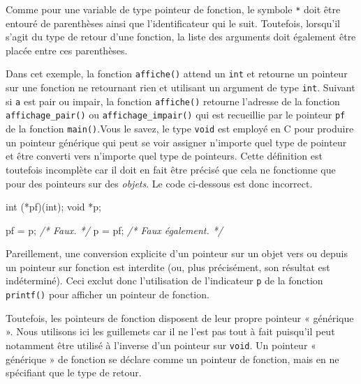 \documentclass[]{article}
\newenvironment{Shaded}{}{}
\newcommand{\DataTypeTok}[1]{\textcolor[rgb]{0.56,0.13,0.00}{{#1}}}
\newcommand{\SpecialCharTok}[1]{\textcolor[rgb]{0.25,0.44,0.63}{{#1}}}
\newcommand{\StringTok}[1]{\textcolor[rgb]{0.25,0.44,0.63}{{#1}}}
\newcommand{\CommentTok}[1]{\textcolor[rgb]{0.38,0.63,0.69}{\textit{{#1}}}}
\newcommand{\NormalTok}[1]{{#1}}
\begin{document}
Comme pour une variable de type pointeur de fonction, le symbole
\texttt{*} doit être entouré de parenthèses ainsi que l'identificateur
qui le suit. Toutefois, lorsqu'il s'agit du type de retour d'une
fonction, la liste des arguments doit également être placée entre ces
parenthèses.

Dans cet exemple, la fonction \texttt{affiche()} attend un \texttt{int}
et retourne un pointeur sur une fonction ne retournant rien et utilisant
un argument de type \texttt{int}. Suivant si \texttt{a} est pair ou
impair, la fonction \texttt{affiche()} retourne l'adresse de la fonction
\texttt{affichage\_pair()} ou \texttt{affichage\_impair()} qui est
recueillie par le pointeur \texttt{pf} de la fonction
\texttt{main()}.Vous le savez, le type \texttt{void} est employé en C
pour produire un pointeur générique qui peut se voir assigner n'importe
quel type de pointeur et être converti vers n'importe quel type de
pointeurs. Cette définition est toutefois incomplète car il doit en fait
être précisé que cela ne fonctionne que pour des pointeurs sur des
\emph{objets}. Le code ci-dessous est donc incorrect.

\begin{Shaded}
\begin{Highlighting}[]
\DataTypeTok{int} \NormalTok{(*pf)(}\DataTypeTok{int}\NormalTok{);}
\DataTypeTok{void} \NormalTok{*p;}

\NormalTok{pf = p; }\CommentTok{/* Faux. */}
\NormalTok{p = pf; }\CommentTok{/* Faux également. */}
\end{Highlighting}
\end{Shaded}

Pareillement, une conversion explicite d'un pointeur sur un objet vers
ou depuis un pointeur sur fonction est interdite (ou, plus précisément,
son résultat est indéterminé). Ceci exclut donc l'utilisation de
l'indicateur \texttt{p} de la fonction \texttt{printf()} pour afficher
un pointeur de fonction.

\begin{Shaded}
\end{Shaded}

Toutefois, les pointeurs de fonction disposent de leur propre pointeur «
générique ». Nous utilisons ici les guillemets car il ne l'est pas tout
à fait puisqu'il peut notamment être utilisé à l'inverse d'un pointeur
sur \texttt{void}. Un pointeur « générique » de fonction se déclare
comme un pointeur de fonction, mais en ne spécifiant que le type de
retour.
\end{document}
